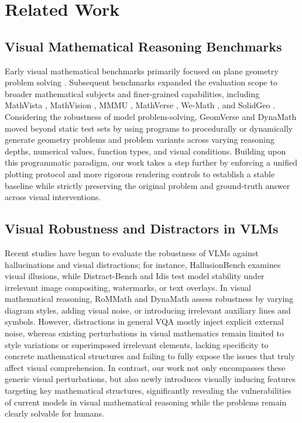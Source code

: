 \documentclass{article}
\theoremstyle{plain}
\theoremstyle{definition}
\theoremstyle{remark}
\begin{document}
\section{Related Work}

\subsection{Visual Mathematical Reasoning Benchmarks}

Early visual mathematical benchmarks primarily focused on plane geometry problem solving \cite{chen2021geoqa, lu2021intergps, chen2022unigeo}. Subsequent benchmarks expanded the evaluation scope to broader mathematical subjects and finer-grained capabilities, including MathVista \cite{lu2024mathvista}, MathVision \cite{wang2024mathvision}, MMMU \cite{yue2024mmmu}, MathVerse \cite{zhang2024mathverse}, We-Math \cite{qiao2025wemath}, and SolidGeo \cite{wang2025solidgeo}. Considering the robustness of model problem-solving, GeomVerse \cite{kazemi2023geomverse} and DynaMath \cite{zou2025dynamath} moved beyond static test sets by using programs to procedurally or dynamically generate geometry problems and problem variants across varying reasoning depths, numerical values, function types, and visual conditions. Building upon this programmatic paradigm, our work takes a step further by enforcing a unified plotting protocol and more rigorous rendering controls to establish a stable baseline while strictly preserving the original problem and ground-truth answer across visual interventions.

\subsection{Visual Robustness and Distractors in VLMs}

Recent studies have begun to evaluate the robustness of VLMs against hallucinations and visual distractions; for instance, HallusionBench \cite{guan2024hallusionbench} examines visual illusions, while Distract-Bench \cite{sun2026distractbench} and Idis \cite{bae2026idis} test model stability under irrelevant image compositing, watermarks, or text overlays. In visual mathematical reasoning, RoMMath \cite{zhao2025rommath} and DynaMath \cite{zou2025dynamath} assess robustness by varying diagram styles, adding visual noise, or introducing irrelevant auxiliary lines and symbols. However, distractions in general VQA mostly inject explicit external noise, whereas existing perturbations in visual mathematics remain limited to style variations or superimposed irrelevant elements, lacking specificity to concrete mathematical structures and failing to fully expose the issues that truly affect visual comprehension. In contrast, our work not only encompasses these generic visual perturbations, but also newly introduces visually inducing features targeting key mathematical structures, significantly revealing the vulnerabilities of current models in visual mathematical reasoning while the problems remain clearly solvable for humans.
\end{document}
